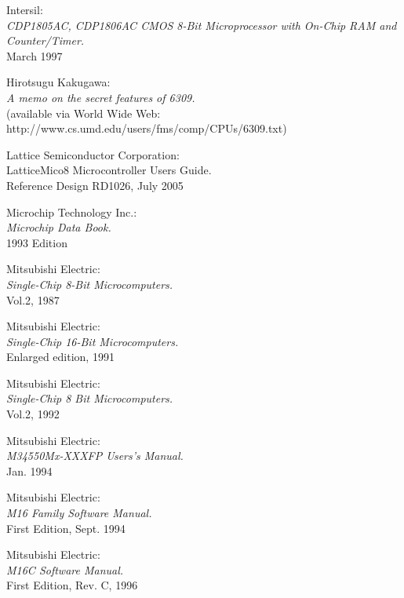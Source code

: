 \documentclass[12pt,twoside]{report}
\begin{document}
\begin{thebibliography}{99}
 Intersil: \\
                 {\em CDP1805AC, CDP1806AC CMOS 8-Bit Microprocessor
                  with On-Chip RAM and Counter/Timer.\/} \\
                 March 1997

 Hirotsugu Kakugawa: \\
               {\em A memo on the secret features of 6309.\/} \\
    	       (available via World Wide Web: \\
      	       http://www.cs.umd.edu/users/fms/comp/CPUs/6309.txt)

 Lattice Semiconductor Corporation: \\
                   {LatticeMico8 Microcontroller Users Guide.\/} \\
                   Reference Design RD1026, July 2005

 Microchip Technology Inc.: \\
                    {\em Microchip Data Book.\/} \\
                    1993 Edition

 Mitsubishi Electric: \\
                {\em Single-Chip 8-Bit Microcomputers.\/} \\
                Vol.2, 1987

 Mitsubishi Electric: \\
                {\em Single-Chip 16-Bit Microcomputers.\/} \\
                Enlarged edition, 1991

 Mitsubishi Electric: \\
               {\em Single-Chip 8 Bit Microcomputers.\/} \\
               Vol.2, 1992

 Mitsubishi Electric: \\
                  {\em M34550Mx-XXXFP Users's Manual.\/} \\
                  Jan. 1994

 Mitsubishi Electric: \\
                 {\em M16 Family Software Manual.\/} \\
                 First Edition, Sept. 1994

 Mitsubishi Electric: \\
      	          {\em M16C Software Manual.\/} \\
                  First Edition, Rev. C, 1996


\end{thebibliography}
\end{document}
